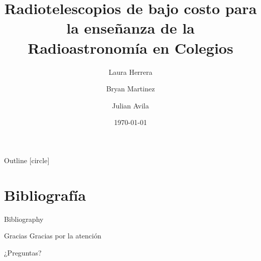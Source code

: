 \documentclass[aspectratio=169,sn-mathphys-num,spanish]{beamer}
\title{Radiotelescopios de bajo costo para la enseñanza de la Radioastronomía en Colegios}
\author{Laura Herrera \and Bryan Martinez \and Julian Avila}
\institute{Universidad Distrital Francisco José de Caldas}
\date{\today}
\begin{document}
\begin{frame}
	\titlepage
\end{frame}

\begin{frame}{Outline}
	[circle]
	\tableofcontents
\end{frame}













\section{Bibliografía}
\begin{frame}[allowframebreaks]{Bibliography}
	\printbibliography
	\nocite{*}
\end{frame}

\begin{frame}{Gracias}
	\centering
	{\LARGE Gracias por la atención}
	\vspace{0.5cm}

	\Large ¿Preguntas?
\end{frame}
\end{document}
